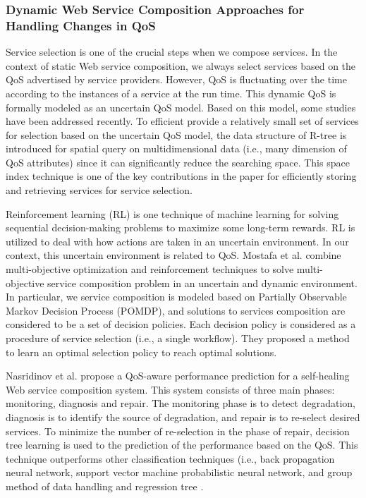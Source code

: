 \subsubsection{Dynamic Web Service Composition Approaches for Handling Changes in QoS}\label{dynamicQoS}

Service selection is one of the crucial steps when we compose services. In the context of static Web service composition, we always select services based on the QoS advertised by service providers. However, QoS is fluctuating over the time according to the instances of a service at the run time. This dynamic QoS is formally modeled as an uncertain QoS model. Based on this model, some studies \cite{wen2014probabilistic} have been addressed recently. To efficient provide a relatively small set of services for selection based on the uncertain QoS model, the data structure of R-tree is introduced for spatial query on multidimensional data (i.e., many dimension of QoS attributes) since it can significantly reduce the searching space. This space index technique is one of the key contributions in the paper for efficiently storing and retrieving services for service selection. 

Reinforcement learning (RL) is one technique of machine learning for solving sequential decision-making problems to maximize some long-term rewards.  RL is utilized to deal with how actions are taken in an uncertain environment. In our context, this uncertain environment is related to QoS. Mostafa et al. \cite{mostafa2015multi} combine multi-objective optimization and reinforcement techniques to solve multi-objective service composition problem in an uncertain and dynamic environment. In particular, we service composition is modeled based on Partially Observable Markov Decision Process (POMDP), and solutions to services composition are considered to be a set of decision policies. Each decision policy is considered as a procedure of service selection (i.e., a single workflow). They proposed a method to learn an optimal selection policy to reach optimal solutions.

Nasridinov et al. \cite{nasridinov2012qos} propose a QoS-aware performance prediction for a self-healing Web service composition system. This system consists of three main phases: monitoring, diagnosis and repair. The monitoring phase is to detect degradation, diagnosis is to identify the source of degradation, and repair is to re-select desired services. To minimize the number of re-selection in the phase of repair, decision tree learning is used to the prediction of the performance based on the QoS. This technique outperforms other classification techniques (i.e., back propagation neural network, support vector machine probabilistic neural network, and group method of data handling and regression tree \cite{mohanty2010web}.

